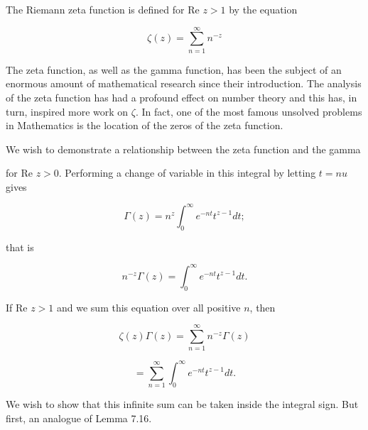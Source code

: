 The Riemann zeta function is defined for $\text{Re } z > 1$ by the equation

$$\zeta(z) = \sum_{n=1}^{\infty} n^{-z}$$

The zeta function, as well as the gamma function, has been the subject of an enormous amount of mathematical research since their introduction. The analysis of the zeta function has had a profound effect on number theory and this has, in turn, inspired more work on $\zeta$. In fact, one of the most famous unsolved problems in Mathematics is the location of the zeros of the zeta function.

We wish to demonstrate a relationship between the zeta function and the gamma

for Re $z > 0$. Performing a change of variable in this integral by letting $t = nu$ gives

$$\Gamma(z) = n^z \int_0^\infty e^{-nt} t^{z-1} dt;$$

that is

$$n^{-z} \Gamma(z) = \int_0^\infty e^{-nt} t^{z-1} dt.$$

If Re $z > 1$ and we sum this equation over all positive $n$, then

$$\zeta(z) \Gamma(z) = \sum_{n=1}^{\infty} n^{-z} \Gamma(z)$$

$$= \sum_{n=1}^{\infty} \int_0^\infty e^{-nt} t^{z-1} dt.$$

We wish to show that this infinite sum can be taken inside the integral sign. But first, an analogue of Lemma 7.16.